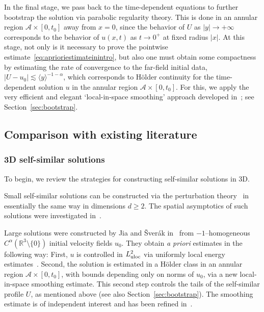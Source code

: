 \documentclass[12pt,reqno]{amsart}
\theoremstyle{plain}
\theoremstyle{definition}
\newcommand{\R}{\mathbb{R}}
\renewcommand{\:}{\colon}
\numberwithin{equation}{section}
\numberwithin{figure}{section}
\begin{document}
In the final stage, we pass back to the time-dependent equations to further bootstrap the solution via parabolic regularity theory. This is done in an annular region $\mathcal{A} \times [0,t_0]$ away from $x=0$, since the behavior of $U$ as $|y| \to +\infty$ corresponds to the behavior of $u(x,t)$ as $t \to 0^+$ at fixed radius $|x|$. At this stage, not only is it necessary to prove the pointwise estimate~\eqref{eq:aprioriestimateinintro}, but also one must obtain some compactness by estimating the rate of convergence to the far-field initial data, $|U - u_0| \lesssim \langle y \rangle^{-1-\alpha}$, which corresponds to H{\"o}lder continuity for the time-dependent solution $u$ in the annular region $\mathcal{A} \times [0,t_0]$. 
For this, we apply the very efficient and elegant `local-in-space smoothing' approach developed in~\cite{jiasverakselfsim}; see Section~\ref{sec:bootstrap}.




\subsection{Comparison with existing literature}

\subsubsection{3D self-similar solutions} To begin, we review the strategies for constructing self-similar solutions in 3D.

Small self-similar solutions can be constructed via the perturbation theory~\cite{CannoneMeyerPlanchonAutosimilaires,CannonePlanchonSelfsimilarSolutionsCPDE,GigaMiyakawaMeasuresInitialVorticity,BarrazaSelfsimilarWeakLp,KochTataruWellposednessNavierStokes} in essentially the same way in dimensions $d \geq 2$. The spatial asymptotics of such solutions were investigated in~\cite{BrandoleseFineProperties}.


Large solutions were constructed by Jia and \v{S}ver{\'a}k in~\cite{jiasverakselfsim} from $-1$--homogeneous $C^\alpha(\R^3 \setminus \{ 0 \})$ initial velocity fields $u_0$. They obtain \emph{a priori} estimates in the following way: First, $u$ is controlled in $L^2_{\rm uloc}$ via uniformly local energy estimates~\cite{LemarieRieussetFirstL2uloc,LemarieRieussetRecentDevelopments,SereginKikuchi,KwonTsaiL2uloc}. Second, the solution is estimated in a H{\"o}lder class in an annular region $\mathcal{A} \times [0,t_0]$, with bounds depending only on norms of $u_0$, via a new local-in-space smoothing estimate. This second step controls the tails of the self-similar profile $U$, as mentioned above (see also Section~\ref{sec:bootstrap}). The smoothing estimate is of independent interest and has been refined in~\cite{BarkerPrangeLocalizedSmoothingConcentration,KangMiuraTsaiLocallyL3,AlbrittonBarkerPrangeLocalizedSmoothingHalfSpace}.
\end{document}
